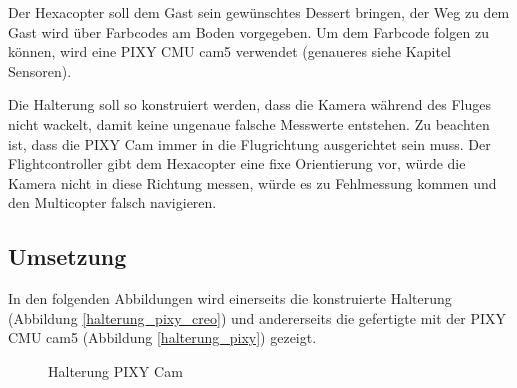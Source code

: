 	Der Hexacopter soll dem Gast sein gewünschtes Dessert bringen, der Weg zu dem Gast wird über Farbcodes am Boden vorgegeben.
	Um dem Farbcode folgen zu können, wird eine PIXY CMU cam5 verwendet (genaueres siehe Kapitel Sensoren).

	Die Halterung soll so konstruiert werden, dass die Kamera während des Fluges nicht wackelt, damit keine ungenaue \bzw falsche Messwerte entstehen.
	Zu beachten ist, dass die PIXY Cam immer in die Flugrichtung ausgerichtet sein muss.
	Der Flightcontroller gibt dem Hexacopter eine fixe Orientierung vor, würde die Kamera nicht in diese Richtung messen, würde es zu Fehlmessung kommen und den Multicopter falsch navigieren.

	\subsection{Umsetzung}

	In den folgenden Abbildungen wird einerseits die konstruierte Halterung (Abbildung \ref{halterung_pixy_creo})
	und andererseits die gefertigte  mit der PIXY CMU cam5 (Abbildung \ref{halterung_pixy}) gezeigt.

			\begin{figure}[thb]
				\begin{centering}
				\par\end{centering}
				\caption{Halterung PIXY Cam}
				\label{Halterung_PIXY}
			\end{figure}

